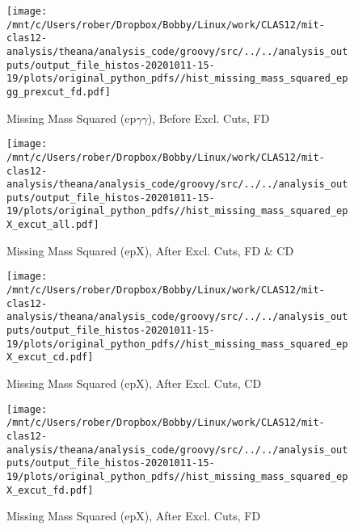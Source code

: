 \documentclass{article}
\begin{document}
\begin{landscape}
    \begin{figure}[h]
        \centering

        \texttt{[image: /mnt/c/Users/rober/Dropbox/Bobby/Linux/work/CLAS12/mit-clas12-analysis/theana/analysis\_code/groovy/src/../../analysis\_outputs/output\_file\_histos-20201011-15-19/plots/original\_python\_pdfs//hist\_missing\_mass\_squared\_epgg\_prexcut\_fd.pdf]}
        \captionsetup{textformat=empty,labelformat=blank}
        \caption{Missing Mass Squared (ep$\gamma$$\gamma$), Before Excl. Cuts, FD}
    \end{figure}
    \clearpage
    
    \begin{figure}[h]
        \centering

        \texttt{[image: /mnt/c/Users/rober/Dropbox/Bobby/Linux/work/CLAS12/mit-clas12-analysis/theana/analysis\_code/groovy/src/../../analysis\_outputs/output\_file\_histos-20201011-15-19/plots/original\_python\_pdfs//hist\_missing\_mass\_squared\_epX\_excut\_all.pdf]}
        \captionsetup{textformat=empty,labelformat=blank}
        \caption{Missing Mass Squared (epX), After Excl. Cuts, FD \& CD}
    \end{figure}
    \clearpage
    
    \begin{figure}[h]
        \centering

        \texttt{[image: /mnt/c/Users/rober/Dropbox/Bobby/Linux/work/CLAS12/mit-clas12-analysis/theana/analysis\_code/groovy/src/../../analysis\_outputs/output\_file\_histos-20201011-15-19/plots/original\_python\_pdfs//hist\_missing\_mass\_squared\_epX\_excut\_cd.pdf]}
        \captionsetup{textformat=empty,labelformat=blank}
        \caption{Missing Mass Squared (epX), After Excl. Cuts, CD}
    \end{figure}
    \clearpage
    
    \begin{figure}[h]
        \centering

        \texttt{[image: /mnt/c/Users/rober/Dropbox/Bobby/Linux/work/CLAS12/mit-clas12-analysis/theana/analysis\_code/groovy/src/../../analysis\_outputs/output\_file\_histos-20201011-15-19/plots/original\_python\_pdfs//hist\_missing\_mass\_squared\_epX\_excut\_fd.pdf]}
        \captionsetup{textformat=empty,labelformat=blank}
        \caption{Missing Mass Squared (epX), After Excl. Cuts, FD}
    \end{figure}
    \clearpage
    
    \begin{figure}[h]
        \centering


\end{figure}
\end{landscape}
\end{document}
